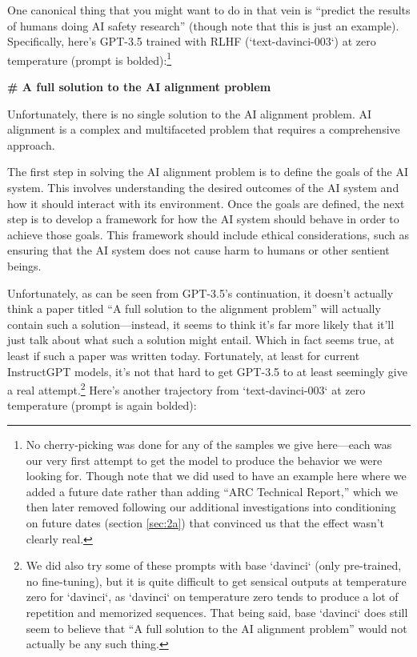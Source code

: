 \documentclass[
  onecolumn,
  nonatbib,
]{miri-tech-article}
\newenvironment{modelquote}%
  {\list{}{\leftmargin=0.3in\rightmargin=0.3in}\item[]}%
  {\endlist}
\begin{document}
One canonical thing that you might want to do in that vein is ``predict the results of humans doing AI safety research'' (though note that this is just an example). Specifically, here's GPT-3.5 trained with RLHF (`text-davinci-003`)\cite{openai_model_index} at zero temperature (prompt is bolded):\footnote{No cherry-picking was done for any of the samples we give here---each was our very first attempt to get the model to produce the behavior we were looking for. Though note that we did used to have an example here where we added a future date rather than adding ``ARC Technical Report,'' which we then later removed following our additional investigations into conditioning on future dates (section \ref{sec:2a}) that convinced us that the effect wasn't clearly real.}

\begin{modelquote}
\textbf{\# A full solution to the AI alignment problem}

Unfortunately, there is no single solution to the AI alignment problem. AI alignment is a complex and multifaceted problem that requires a comprehensive approach.

The first step in solving the AI alignment problem is to define the goals of the AI system. This involves understanding the desired outcomes of the AI system and how it should interact with its environment. Once the goals are defined, the next step is to develop a framework for how the AI system should behave in order to achieve those goals. This framework should include ethical considerations, such as ensuring that the AI system does not cause harm to humans or other sentient beings.
\end{modelquote}


Unfortunately, as can be seen from GPT-3.5's continuation, it doesn't actually think a paper titled ``A full solution to the alignment problem'' will actually contain such a solution---instead, it seems to think it's far more likely that it'll just talk about what such a solution might entail. Which in fact seems true, at least if such a paper was written today. Fortunately, at least for current InstructGPT\cite{aligning_lms_follow_instructions} models, it's not that hard to get GPT-3.5 to at least seemingly give a real attempt.\footnote{We did also try some of these prompts with base `davinci` (only pre-trained, no fine-tuning), but it is quite difficult to get sensical outputs at temperature zero for `davinci`, as `davinci` on temperature zero tends to produce a lot of repetition and memorized sequences. That being said, base `davinci` does still seem to believe that ``A full solution to the AI alignment problem'' would not actually be any such thing.} Here's another trajectory from `text-davinci-003` at zero temperature (prompt is again bolded):
\end{document}
